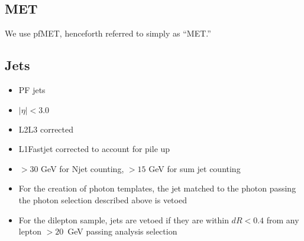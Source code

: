 \subsection{MET}

We use pfMET, henceforth referred to simply as ``MET.''

\subsection{Jets}

\begin{itemize}
\item PF jets
\item $|\eta| < 3.0$ %
\item L2L3 corrected
\item L1Fastjet corrected to account for pile up
\item \pt $ > 30$ GeV for Njet counting, \pt $ > 15$ GeV for sum jet \pt counting
\item For the creation of photon templates, the jet matched to the photon passing the photon selection described above is vetoed
\item For the dilepton sample, jets are vetoed if they are within $dR < 0.4$ from any lepton \pt $ > 20$~GeV passing analysis selection
\end{itemize}

